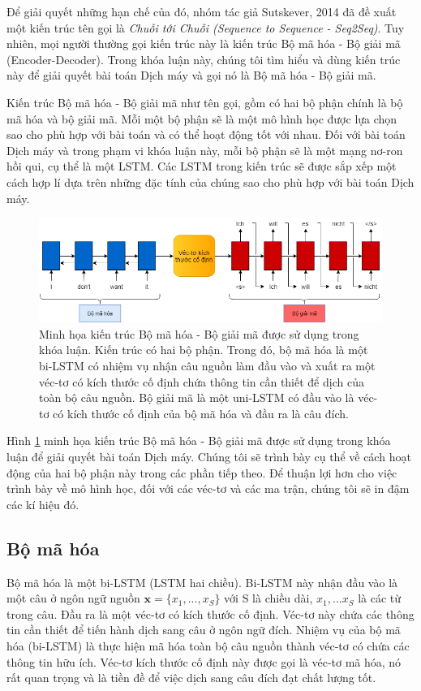 Để giải quyết những hạn chế của đó, nhóm tác giả Sutskever, 2014 \cite{Seq2Seq2014} đã đề xuất một kiến trúc tên gọi là \textit{Chuỗi tới Chuỗi (Sequence to Sequence - Seq2Seq)}. Tuy nhiên, mọi người thường gọi kiến trúc này là kiến trúc Bộ mã hóa - Bộ giải mã (Encoder-Decoder). Trong khóa luận này, chúng tôi tìm hiểu và dùng kiến trúc này để giải quyết bài toán Dịch máy và gọi nó là Bộ mã hóa - Bộ giải mã.

Kiến trúc Bộ mã hóa - Bộ giải mã như tên gọi, gồm có hai bộ phận chính là bộ mã hóa và bộ giải mã. Mỗi một bộ phận sẽ là một mô hình học được lựa chọn sao cho phù hợp với bài toán và có thể hoạt động tốt với nhau. Đối với bài toán Dịch máy và trong phạm vi khóa luận này, mỗi bộ phận sẽ là một mạng nơ-ron hồi qui, cụ thể là một LSTM. Các LSTM trong kiến trúc sẽ được sắp xếp một cách hợp lí dựa trên những đặc tính của chúng sao cho phù hợp với bài toán Dịch máy.

\begin{figure}
	\centering
	\includegraphics[width=1.0\textwidth]{Encoder-Decoder-bi}
	\caption[Minh họa kiến trúc Bộ mã hóa - Bộ giải mã được sử dụng trong khóa luận.]{Minh họa kiến trúc Bộ mã hóa - Bộ giải mã được sử dụng trong khóa luận. Kiến trúc có hai bộ phận. Trong đó, bộ mã hóa là một bi-LSTM có nhiệm vụ nhận câu nguồn làm đầu vào và xuất ra một véc-tơ có kích thước cố định chứa thông tin cần thiết để dịch của toàn bộ câu nguồn. Bộ giải mã là một uni-LSTM có đầu vào là véc-tơ có kích thước cố định của bộ mã hóa và đầu ra là câu đích.}
	\label{fig_Encoder-Decoder}
\end{figure}

Hình \ref{fig_Encoder-Decoder} minh họa kiến trúc Bộ mã hóa - Bộ giải mã được sử dụng trong khóa luận để giải quyết bài toán Dịch máy. Chúng tôi sẽ trình bày cụ thể về cách hoạt động của hai bộ phận này trong các phần tiếp theo. Để thuận lợi hơn cho việc trình bày về mô hình học, đối với các véc-tơ và các ma trận, chúng tôi sẽ in đậm các kí hiệu đó.

\subsection{Bộ mã hóa}
Bộ mã hóa là một bi-LSTM (LSTM hai chiều). Bi-LSTM này nhận đầu vào là một câu ở ngôn ngữ nguồn $\bm{x} = \{x_1, ..., x_S\}$ với S là chiều dài, $x_1,...x_S$ là các từ trong câu. Đầu ra là một véc-tơ có kích thước cố định. Véc-tơ này chứa các thông tin cần thiết để tiến hành dịch sang câu ở ngôn ngữ đích. Nhiệm vụ của bộ mã hóa (bi-LSTM) là thực hiện mã hóa toàn bộ câu nguồn thành véc-tơ có chứa các thông tin hữu ích. Véc-tơ kích thước cố định này được gọi là véc-tơ mã hóa, nó rất quan trọng và là tiền đề để việc dịch sang câu đích đạt chất lượng tốt.

